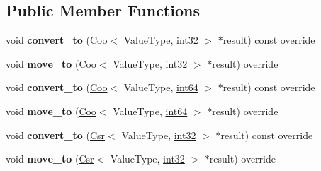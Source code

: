 \subsection*{Public Member Functions}
\begin{DoxyCompactItemize}
\item 
\mbox{\label{classgko_1_1matrix_1_1Dense_adaaa152f7bf3566d858a2c81220329a3}} 
void {\bfseries convert\+\_\+to} (\hyperlink{classgko_1_1matrix_1_1Coo}{Coo}$<$ Value\+Type, \hyperlink{namespacegko_a1ec26caa2379a21a8d0cde611559fff6}{int32} $>$ $\ast$result) const override
\item 
\mbox{\label{classgko_1_1matrix_1_1Dense_abff1b9260efc76c7bf1f0fe9831ddf6b}} 
void {\bfseries move\+\_\+to} (\hyperlink{classgko_1_1matrix_1_1Coo}{Coo}$<$ Value\+Type, \hyperlink{namespacegko_a1ec26caa2379a21a8d0cde611559fff6}{int32} $>$ $\ast$result) override
\item 
\mbox{\label{classgko_1_1matrix_1_1Dense_af231fda06f31db0bd8d7c7bbe2ad428e}} 
void {\bfseries convert\+\_\+to} (\hyperlink{classgko_1_1matrix_1_1Coo}{Coo}$<$ Value\+Type, \hyperlink{namespacegko_a6c57dbf3168b1ecad3ea133aaf2efbc1}{int64} $>$ $\ast$result) const override
\item 
\mbox{\label{classgko_1_1matrix_1_1Dense_ac98a4016b066bcf524b7d391c01b69e6}} 
void {\bfseries move\+\_\+to} (\hyperlink{classgko_1_1matrix_1_1Coo}{Coo}$<$ Value\+Type, \hyperlink{namespacegko_a6c57dbf3168b1ecad3ea133aaf2efbc1}{int64} $>$ $\ast$result) override
\item 
\mbox{\label{classgko_1_1matrix_1_1Dense_a78d637e4687f6b82380c0f690a0030b9}} 
void {\bfseries convert\+\_\+to} (\hyperlink{classgko_1_1matrix_1_1Csr}{Csr}$<$ Value\+Type, \hyperlink{namespacegko_a1ec26caa2379a21a8d0cde611559fff6}{int32} $>$ $\ast$result) const override
\item 
\mbox{\label{classgko_1_1matrix_1_1Dense_af5cd43fb7c68506437bbc168e160db3d}} 
void {\bfseries move\+\_\+to} (\hyperlink{classgko_1_1matrix_1_1Csr}{Csr}$<$ Value\+Type, \hyperlink{namespacegko_a1ec26caa2379a21a8d0cde611559fff6}{int32} $>$ $\ast$result) override
\item 

\end{DoxyCompactItemize}
